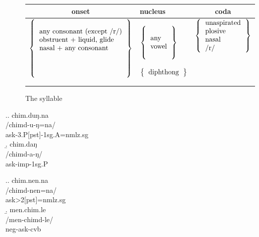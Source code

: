 \begin{figure}[htp] 
\begin{tabular}{cp{3cm}c} 
{\sc onset}&{\sc nucleus}&{\sc coda}\\
\midrule 
$
\left\{
\begin{tabular}{l}
\\
any consonant (except /r/) \\
obstruent + liquid, glide\\
nasal + any consonant\\
\\ 
\\
\\
\end{tabular}
\right\}
$  
&$
\left\{
\begin{tabular}{l}
\\
any   \\
vowel\\
 \\
\end{tabular}
\right\}$  
\par 
\par 
$
\left\{
\begin{tabular}{l}
diphthong \\ 
\end{tabular}
\right\}$  
&$
\left\{
\begin{tabular}{l}
unaspirated \\
plosive\\
nasal\\
/r/\\ 
\end{tabular}
\right\}$   
\end{tabular} 
 

\caption{The syllable}\label{syll} 
\end{figure}



\ex.\a. \glll chim.duŋ.na\\
/chimd-u-ŋ=na/\\
ask{\sc -3.P[pst]-1sg.A=nmlz.sg}\\
\b. \glll chim.daŋ\\
/chimd-a-ŋ/\\
ask{\sc -imp-1sg.P}\\

\ex.\a. \glll chim.nen.na\\
/chimd-nen=na/\\
ask{>2[pst]=nmlz.sg}\\
\b. \glll men.chim.le\\
/men-chimd-le/\\
{\sc neg-}ask{\sc -cvb}\\


